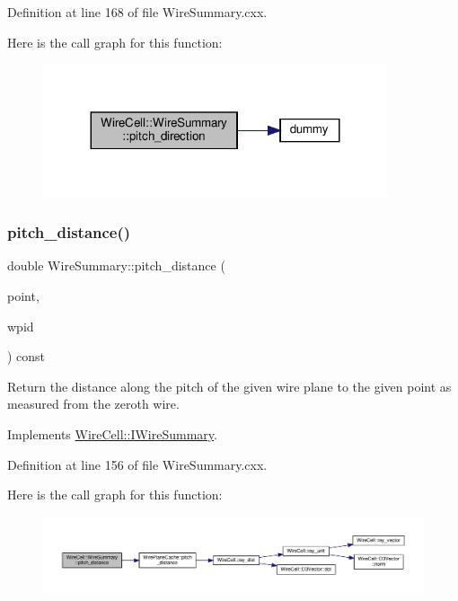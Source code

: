 Definition at line 168 of file Wire\+Summary.\+cxx.

Here is the call graph for this function\+:
\nopagebreak
\begin{figure}[H]
\begin{center}
\leavevmode
\includegraphics[width=287pt]{class_wire_cell_1_1_wire_summary_a0b38146487504f384c0a619db67f6e4a_cgraph}
\end{center}
\end{figure}
\mbox{\label{class_wire_cell_1_1_wire_summary_a61c1c383ee6b110a37609a3d892b01d2}} 
\subsubsection{\texorpdfstring{pitch\+\_\+distance()}{pitch\_distance()}}
{\footnotesize\ttfamily double Wire\+Summary\+::pitch\+\_\+distance (\begin{DoxyParamCaption}\item[{const \hyperlink{namespace_wire_cell_ab2b2565fa6432efbb4513c14c988cda9}{Point} \&}]{point,  }\item[{\hyperlink{class_wire_cell_1_1_wire_plane_id}{Wire\+Plane\+Id}}]{wpid }\end{DoxyParamCaption}) const\hspace{0.3cm}{\ttfamily [virtual]}}

Return the distance along the pitch of the given wire plane to the given point as measured from the zeroth wire. 

Implements \hyperlink{class_wire_cell_1_1_i_wire_summary_ac84fc8bf80d707050bda62b0dc9355fd}{Wire\+Cell\+::\+I\+Wire\+Summary}.



Definition at line 156 of file Wire\+Summary.\+cxx.

Here is the call graph for this function\+:
\nopagebreak
\begin{figure}[H]
\begin{center}
\leavevmode
\includegraphics[width=350pt]{class_wire_cell_1_1_wire_summary_a61c1c383ee6b110a37609a3d892b01d2_cgraph}
\end{center}
\end{figure}


